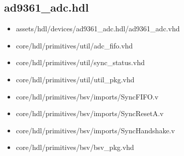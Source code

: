 \documentclass{article}
\def\comp{ad9361\_adc}
\begin{document}
\subsection*{\comp.hdl}
\begin{itemize}
	\item assets/hdl/devices/\comp.hdl/\comp.vhd
	\item core/hdl/primitives/util/adc\_fifo.vhd
	\item core/hdl/primitives/util/sync\_status.vhd
	\item core/hdl/primitives/util/util\_pkg.vhd
	\item core/hdl/primitives/bsv/imports/SyncFIFO.v
	\item core/hdl/primitives/bsv/imports/SyncResetA.v
	\item core/hdl/primitives/bsv/imports/SyncHandshake.v
	\item core/hdl/primitives/bsv/bsv\_pkg.vhd
\end{itemize}
\end{document}
